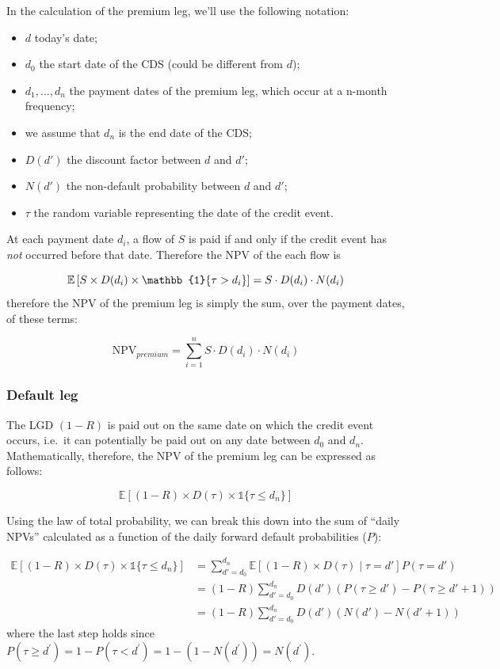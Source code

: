 In the calculation of the premium leg, we'll use the following notation:

\begin{itemize}
\tightlist
\item
  \(d\) today's date;
\item
  \(d_0\) the start date of the CDS (could be different from \(d\));
\item
  \(d_1, ..., d_n\) the payment dates of the premium leg, which occur at
  a n-month frequency;
\item
  we assume that \(d_n\) is the end date of the CDS;
\item
  \(D(d')\) the discount factor between \(d\) and \(d'\);
\item
  \(N(d')\) the non-default probability between \(d\) and \(d'\);
\item
  \(\tau\) the random variable representing the date of the credit event.
\end{itemize}

At each payment date \(d_i\), a flow of \(S\) is paid if and only if the
credit event has \emph{not} occurred before that date. Therefore the NPV of the
each flow is

\[
\def\1{\mathbb{1}}
\def\set#1{\!\left\{ #1 \right\}}
\mathbb{E}\left[ S \times D(d_i) \times \1\set{\tau > d_i} \right] = S \cdot D(d_i) \cdot N(d_i)
\]
therefore the NPV of the premium leg is simply the sum, over the payment
dates, of these terms:

\[\textrm{NPV}_{premium} = \sum_{i=1}^{n} S \cdot D(d_i) \cdot N(d_i)\]

\subsubsection{Default leg}\label{default-leg}

The LGD \((1-R)\) is paid out on the same date on which the credit event
occurs, i.e.~it can potentially be paid out on any date between \(d_0\)
and \(d_n\). Mathematically, therefore, the NPV of the premium leg can
be expressed as follows:

\[
\mathbb{E}[(1-R) \times D(\tau) \times \mathbb{1} \{\tau \leq d_n\} ]
\]

Using the law of total probability, we can break this down into the sum
of ``daily NPVs'' calculated as a function of the daily forward default
probabilities ($P$):

\begin{align*}
\mathbb{E}[(1-R) \times D(\tau) \times \mathbb{1}\{\tau \leq d_n\} ]
&= \sum_{d'=d_0}^{d_n} \mathbb{E}[ (1-R) \times D(\tau) \mid \tau = d'] P(\tau = d') \\
&= (1-R) \sum_{d'=d_0}^{d_n} D(d') \left(P(\tau \geq d') - P( \tau \geq d'+1) \right) \\
&= (1-R) \sum_{d'=d_0}^{d_n} D(d') \left( N(d') - N(d'+1) \right)
\end{align*}
where the last step holds since $P(\tau\geq d^{'}) = 1 - P(\tau < d^{'}) = 1 - (1-N(d^{'})) = N(d^{'})$.

